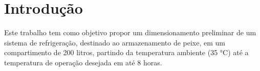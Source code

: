 
\chapter{Introdução}

Este trabalho tem como objetivo propor 
um dimensionamento preliminar de um sistema de 
refrigeração, destinado ao armazenamento de peixe, em um
compartimento de 200 litros, partindo da 
temperatura ambiente (35 °C) até a temperatura de
operação desejada em até 8 horas.